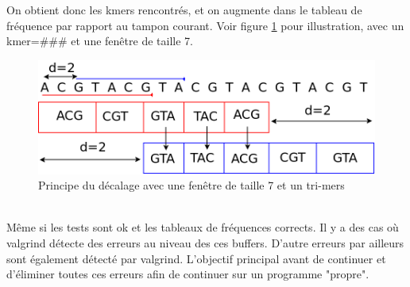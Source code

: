 On obtient donc les kmers rencontrés, et on augmente dans le tableau de fréquence par rapport au tampon courant. Voir figure \ref{decalage} pour illustration, avec un kmer=\#\#\# et une fenêtre de taille 7.

\begin{figure}[H]
\begin{center}
\includegraphics[scale=0.4]{./../img/decalage.png}
\caption[Principe du décalage]{\label{decalage}Principe du décalage avec une fenêtre de taille 7 et un tri-mers}
\end{center}
\end{figure}
~\\

Même si les tests sont ok et les tableaux de fréquences corrects. Il y a des cas où valgrind détecte des erreurs au niveau des ces buffers. D'autre erreurs par ailleurs sont également détecté par valgrind. L'objectif principal avant de continuer et d'éliminer toutes ces erreurs afin de continuer sur un programme "propre".
